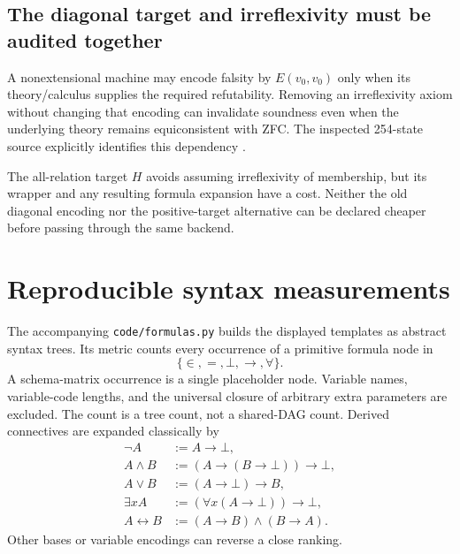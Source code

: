 \documentclass[11pt,letterpaper]{article}
\theoremstyle{definition}\newtheorem{definition}[theorem]{Definition}
\theoremstyle{remark}\newtheorem{remark}[theorem]{Remark}
\begin{document}
\subsection{The diagonal target and irreflexivity must be audited together}

A nonextensional machine may encode falsity by $E(v_0,v_0)$ only when its
theory/calculus supplies the required refutability. Removing an
irreflexivity axiom without changing that encoding can invalidate
soundness even when the underlying theory remains equiconsistent with
ZFC. The inspected 254-state source explicitly identifies this dependency
\cite{upstream}.

The all-relation target $H$ avoids assuming irreflexivity of membership,
but its wrapper and any resulting formula expansion have a cost.
Neither the old diagonal encoding nor the positive-target alternative
can be declared cheaper before passing through the same backend.

\section{Reproducible syntax measurements}
\label{sec:metrics}

The accompanying \texttt{code/formulas.py} builds the displayed templates
as abstract syntax trees. Its metric counts every occurrence of a
primitive formula node in
\[
 \{\in,=,\bot,\to,\forall\}.
\]
A schema-matrix occurrence is a single placeholder node. Variable names,
variable-code lengths, and the universal closure of arbitrary extra
parameters are excluded. The count is a tree count, not a shared-DAG
count. Derived connectives are expanded classically by
\begin{align*}
 \neg A&:=A\to\bot,\\
 A\land B&:=(A\to(B\to\bot))\to\bot,\\
 A\lor B&:=(A\to\bot)\to B,\\
 \exists x A&:=(\forall x(A\to\bot))\to\bot,\\
 A\leftrightarrow B&:=(A\to B)\land(B\to A).
\end{align*}
Other bases or variable encodings can reverse a close ranking.
\end{document}
